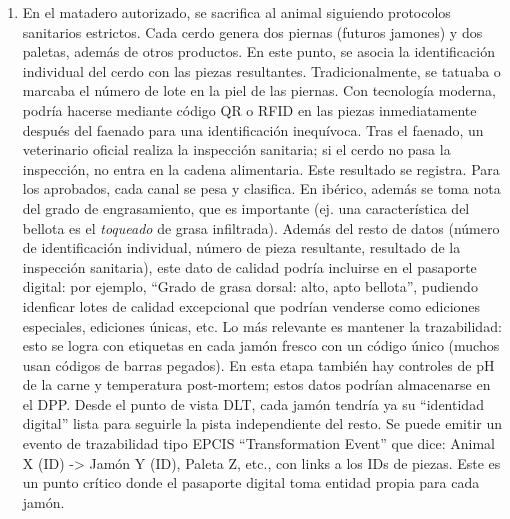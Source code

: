 \begin{enumerate}
    \item En el matadero autorizado, se sacrifica al animal siguiendo protocolos sanitarios estrictos. Cada cerdo genera dos piernas (futuros jamones) y dos paletas, además de otros productos. En este punto, se asocia la identificación individual del cerdo con las piezas resultantes. Tradicionalmente, se tatuaba o marcaba el número de lote en la piel de las piernas. Con tecnología moderna, podría hacerse mediante código QR o RFID en las piezas inmediatamente después del faenado para una identificación inequívoca. Tras el faenado, un veterinario oficial realiza la inspección sanitaria; si el cerdo no pasa la inspección, no entra en la cadena alimentaria. Este resultado se registra. Para los aprobados, cada canal se pesa y clasifica. En ibérico, además se toma nota del grado de engrasamiento, que es importante (ej. una característica del bellota es el \textit{toqueado} de grasa infiltrada). Además del resto de datos (número de identificación individual, número de pieza resultante, resultado de la inspección sanitaria), este dato de calidad podría incluirse en el pasaporte digital: por ejemplo, “Grado de grasa dorsal: alto, apto bellota”, pudiendo idenficar lotes de calidad excepcional que podrían venderse como ediciones especiales, ediciones únicas, etc. Lo más relevante es mantener la trazabilidad: esto se logra con etiquetas en cada jamón fresco con un código único (muchos usan códigos de barras pegados). En esta etapa también hay controles de pH de la carne y temperatura post-mortem; estos datos podrían almacenarse en el DPP. Desde el punto de vista DLT, cada jamón tendría ya su “identidad digital” lista para seguirle la pista independiente del resto. Se puede emitir un evento de trazabilidad tipo EPCIS “Transformation Event” que dice: Animal X (ID) -> Jamón Y (ID), Paleta Z, etc., con links a los IDs de piezas. Este es un punto crítico donde el pasaporte digital toma entidad propia para cada jamón.

\end{enumerate}
